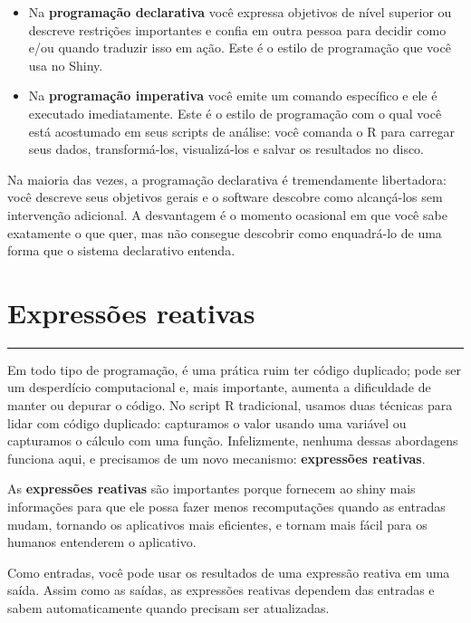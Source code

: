 \documentclass[
]{book}
\begin{document}
\begin{itemize}
\item
  Na \textbf{programação declarativa} você expressa objetivos de nível superior ou descreve restrições importantes e confia em outra pessoa para decidir como e/ou quando traduzir isso em ação. Este é o estilo de programação que você usa no Shiny.
\item
  Na \textbf{programação imperativa} você emite um comando específico e ele é executado imediatamente. Este é o estilo de programação com o qual você está acostumado em seus scripts de análise: você comanda o R para carregar seus dados, transformá-los, visualizá-los e salvar os resultados no disco.
\end{itemize}

Na maioria das vezes, a programação declarativa é tremendamente libertadora: você descreve seus objetivos gerais e o software descobre como alcançá-los sem intervenção adicional. A desvantagem é o momento ocasional em que você sabe exatamente o que quer, mas não consegue descobrir como enquadrá-lo de uma forma que o sistema declarativo entenda.

\hypertarget{expressuxf5es-reativas}{%
\chapter{\texorpdfstring{\textbf{Expressões reativas}}{Expressões reativas}}\label{expressuxf5es-reativas}}

\begin{center}\rule{0.5\linewidth}{0.5pt}\end{center}

Em todo tipo de programação, é uma prática ruim ter código duplicado; pode ser um desperdício computacional e, mais importante, aumenta a dificuldade de manter ou depurar o código. No script R tradicional, usamos duas técnicas para lidar com código duplicado: capturamos o valor usando uma variável ou capturamos o cálculo com uma função. Infelizmente, nenhuma dessas abordagens funciona aqui, e precisamos de um novo mecanismo: \textbf{expressões reativas}.

As \textbf{expressões reativas} são importantes porque fornecem ao shiny mais informações para que ele possa fazer menos recomputações quando as entradas mudam, tornando os aplicativos mais eficientes, e tornam mais fácil para os humanos entenderem o aplicativo.

Como entradas, você pode usar os resultados de uma expressão reativa em uma saída. Assim como as saídas, as expressões reativas dependem das entradas e sabem automaticamente quando precisam ser atualizadas.
\end{document}
